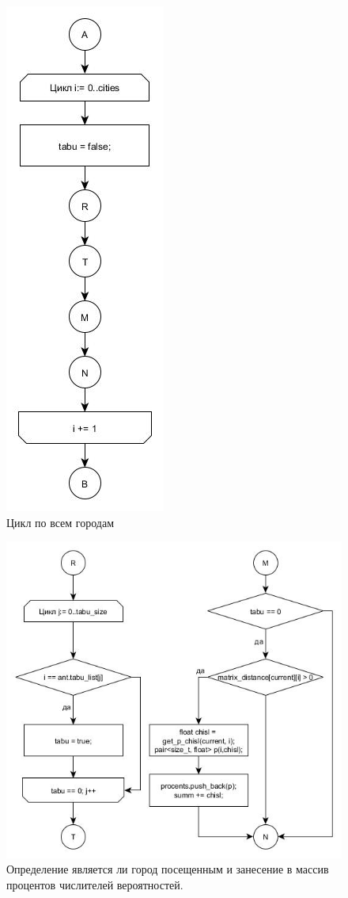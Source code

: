 \documentclass[a4paper, 14pt]{article}
\begin{document}
\begin{figure}[h!]
\center
\includegraphics[scale=0.7]{get_p_2_ab.jpg}
\caption{Цикл по всем городам}
\label{ris:get_p_2}
\end{figure}\newpage

\begin{figure}[h!]
\center
\includegraphics[scale=0.6]{get_p_4_rtmn.jpg}
\caption{Определение является ли город посещенным и занесение в массив процентов числителей вероятностей.}
\label{ris:get_p_4}
\end{figure}\newpage
\end{document}
